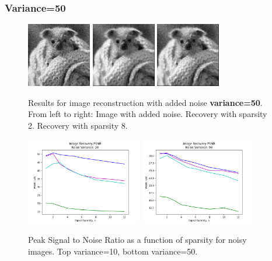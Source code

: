 \documentclass{article}
\begin{document}
\subsubsection*{Variance=50}
\begin{figure}[h]
    \captionsetup{width=.5\linewidth}
    \centering
        \includegraphics[width=0.25\textwidth]{images/koala_noise-50.png}
        \includegraphics[width=0.25\textwidth]{images/koala_noise-50-recovered_02.png}
        \includegraphics[width=0.25\textwidth]{images/koala_noise-50-recovered_08.png}
        \caption{Results for image reconstruction with added noise {\bf variance=50}. From left to right: Image with added noise. Recovery with sparsity 2. Recovery with sparsity 8.}
\end{figure}


\begin{figure}
    \captionsetup{width=.45\linewidth}
    \centering
        \includegraphics[width=0.45\textwidth]{plots/d3-noise-10.png}
        \includegraphics[width=0.45\textwidth]{plots/d3-noise-50.png}
        \caption{Peak Signal to Noise Ratio as a function of sparsity for noisy images. Top variance=10, bottom variance=50.}
\end{figure}
\end{document}
